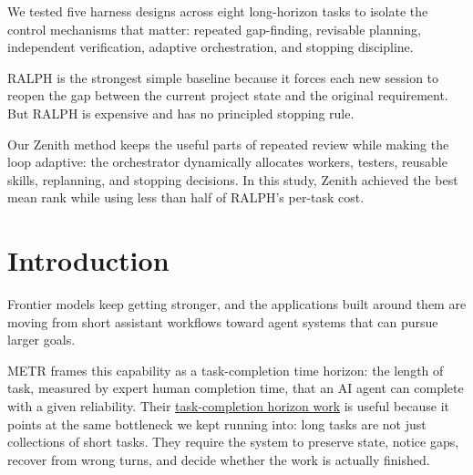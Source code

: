 \documentclass[11pt,a4paper]{article}
\begin{document}
\begin{titlepage}
\begin{epigraph}
\medskip
We tested five harness designs across eight long-horizon tasks to isolate the control mechanisms that matter: repeated gap-finding, revisable planning, independent verification, adaptive orchestration, and stopping discipline.

\medskip
RALPH is the strongest simple baseline because it forces each new session to reopen the gap between the current project state and the original requirement. But RALPH is expensive and has no principled stopping rule.

\medskip
Our Zenith method keeps the useful parts of repeated review while making the loop adaptive: the orchestrator dynamically allocates workers, testers, reusable skills, replanning, and stopping decisions. In this study, Zenith achieved the best mean rank while using less than half of RALPH's per-task cost.
\end{epigraph}

\vfill
\end{titlepage}

{
\hypersetup{linkcolor=ink}
\thispagestyle{empty}
\tableofcontents
}
\clearpage
\setcounter{page}{1}

\section{Introduction}

Frontier models keep getting stronger, and the applications built around them are moving from short assistant workflows toward agent systems that can pursue larger goals.

METR frames this capability as a task-completion time horizon: the length of task, measured by expert human completion time, that an AI agent can complete with a given reliability. Their \href{https://metr.org/time-horizons/}{task-completion horizon work} is useful because it points at the same bottleneck we kept running into: long tasks are not just collections of short tasks. They require the system to preserve state, notice gaps, recover from wrong turns, and decide whether the work is actually finished.
\end{document}
